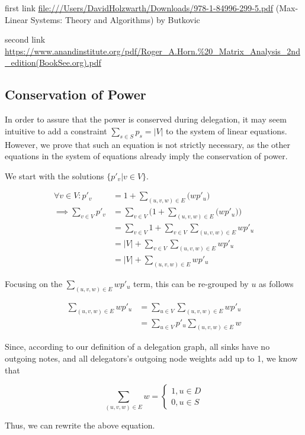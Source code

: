 first link \url{file:///Users/DavidHolzwarth/Downloads/978-1-84996-299-5.pdf} (Max-Linear Systems: Theory and Algorithms) by Butkovic

second link \url{https://www.anandinstitute.org/pdf/Roger_A.Horn.%20_Matrix_Analysis_2nd_edition(BookSee.org).pdf}

 \subsection{Conservation of Power}
 
 In order to assure that the power is conserved during delegation, it may seem intuitive to add a constraint $\sum_{s \in S} p_s = |V|$ to the system of linear equations. However, we prove that such an equation is not strictly necessary, as the other equations in the system of equations already imply the conservation of power.

We start with the solutions $\{p'_v | v \in V\}$.

\begin{align*}
\forall v \in V: p'_v &= 1+\sum_{(u, v, w) \in E} \bigl(wp'_u \bigr) \\
\implies \sum_{v \in V} p'_v &= \sum_{v \in V} \bigl( 1 + \sum_{(u, v, w) \in E} \bigl( wp'_u \bigr ) \bigr) \\
&= \sum_{v \in V} 1 + \sum_{v \in V} \sum_{(u, v, w) \in E} wp'_u \\
&= |V| + \sum_{v \in V} \sum_{(u, v, w) \in E} wp'_u \\
&= |V| + \sum_{(u, v, w) \in E} wp'_u
\end{align*}

Focusing on the $\sum_{(u, v, w) \in E} wp'_u$ term, this can be re-grouped by $u$ as follows 

\begin{align*}
\sum_{(u, v, w) \in E} wp'_u &= \sum_{u \in V} \sum_{(u, v, w) \in E} wp'_u \\
&= \sum_{u \in V} p'_u  \sum_{(u, v, w) \in E} w
\end{align*}

Since, according to our definition of a delegation graph, all sinks have no outgoing notes, and all delegators's outgoing node weights add up to 1, we know that

\[
\sum_{(u, v, w) \in E} w = \begin{cases} 1, u \in D \\ 0, u \in S \end{cases}
\]

Thus, we can rewrite the above equation.

